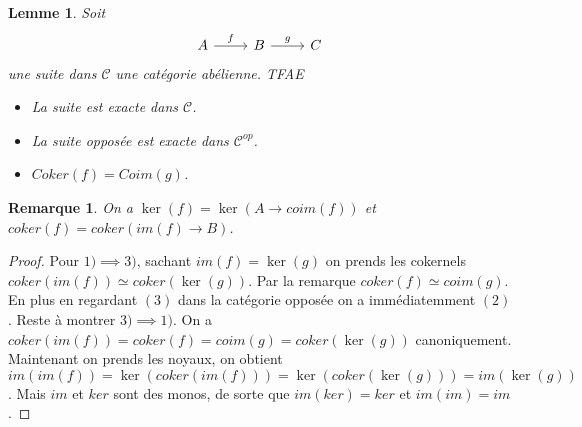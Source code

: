 \documentclass[a4paper,12pt]{book}
\newcommand{\Cat}{\mathcal{C}}
\theoremstyle{plain}
\newtheorem{lem}[subsection]{Lemme}
\newtheorem{rem}{Remarque}
\theoremstyle{definition}
\theoremstyle{remark}
\begin{document}
\begin{lem}
    Soit
\[\begin{tikzcd}
	A & B & C
	\arrow["f", from=1-1, to=1-2]
	\arrow["g", from=1-2, to=1-3]
\end{tikzcd}\]
une suite dans $\Cat$ une catégorie abélienne. TFAE
\begin{itemize}
    \item La suite est exacte dans $\Cat$.
    \item La suite opposée est exacte dans $\Cat^{op}$.
    \item $Coker(f)=Coim(g)$.
\end{itemize}
\end{lem}
\begin{rem}
    On a $\ker(f)=\ker(A\to coim(f))$ et $coker(f)=coker(im(f)\to B)$.
\end{rem}
\begin{proof}
    Pour $1)\implies 3)$, sachant $im(f)=\ker(g)$ on prends les 
    cokernels $coker(im(f))\simeq coker(\ker(g))$. Par la remarque
    $coker(f)\simeq coim(g)$. En plus en regardant $(3)$ dans la 
    catégorie opposée on a immédiatemment $(2)$. Reste à montrer
    $3)\implies 1)$. On a $coker(im(f))=coker(f)=coim(g)=coker(\ker(g))$
    canoniquement. Maintenant on prends les noyaux, on obtient 
    $im(im(f))=\ker(coker(im(f)))=\ker(coker(\ker(g)))=im(\ker(g))$. 
    Mais $im$ et $ker$ sont des monos, de sorte que $im(ker)=ker$ et
    $im(im)=im$.
\end{proof}
\end{document}
